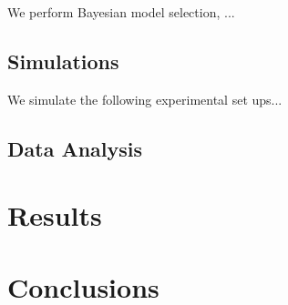 \documentclass[11pt]{article}
\begin{document}
We perform Bayesian model selection, ...

\subsection{Simulations}

We simulate the following experimental set ups...

\subsection{Data Analysis}



\section{Results}

\section{Conclusions}





\end{document}
